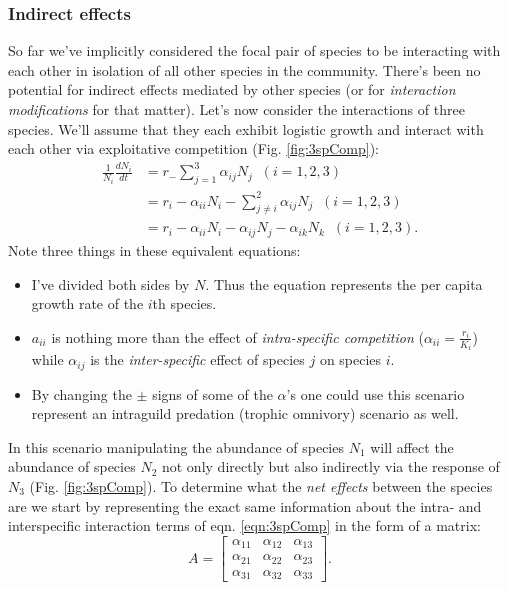 \documentclass[10pt,letterpaper]{article}
\begin{document}
\subsubsection{Indirect effects}
\label{IndirectEffects}
So far we've implicitly considered the focal pair of species to be interacting with each other in isolation of all other species in the community.  There's been no potential for indirect effects mediated by other species (or for \emph{interaction modifications} for that matter).  Let's now consider the interactions of three species.  We'll assume that they each exhibit logistic growth and  interact with each other via exploitative competition (Fig. \ref{fig:3spComp}):
\begin{subequations}
\begin{align}
\frac{1}{N_i}\frac{dN_i}{dt}&=r_-\sum_{j=1}^3 \alpha_{ij}N_j \;\; (i=1,2,3) \\
&=r_i - \alpha_{ii}N_i - \sum_{j\neq i}^2 \alpha_{ij} N_j \;\; (i=1,2,3) \\
&=r_i - \alpha_{ii}N_i - \alpha_{ij} N_j - \alpha_{ik} N_k \;\; (i=1,2,3).
\label{eqn:3spComp}
\end{align}
\end{subequations}
Note three things in these equivalent equations:
\begin{itemize}
\item I've divided both sides by $N$.  Thus the equation represents the per capita growth rate of the $i$th species.
\item  $a_{ii}$ is nothing more than the effect of \emph{intra-specific competition} ($\alpha_{ii}=\tfrac{r_i}{K_i}$) while $\alpha_{ij}$ is the \emph{inter-specific} effect of species $j$ on species $i$.  
\item By changing the $\pm$ signs of some of the $\alpha$'s one could use this scenario represent an intraguild predation (trophic omnivory) scenario as well.
\end{itemize}


In this scenario manipulating the abundance of species $N_1$ will affect the abundance of species $N_2$ not only directly but also indirectly via the response of $N_3$ (Fig. \ref{fig:3spComp}).  To determine what the \emph{net effects} between the species are we start by representing the exact same information about the intra- and interspecific interaction terms of eqn. \ref{eqn:3spComp} in the form of a matrix:
\begin{equation}
A=\left[\begin{array}{ccc}
\alpha_{11} & \alpha_{12} & \alpha_{13} \\
\alpha_{21} & \alpha_{22} & \alpha_{23} \\
\alpha_{31} & \alpha_{32} & \alpha_{33}
\end{array}\right].
\end{equation}
\end{document}
